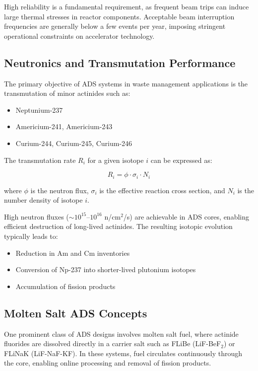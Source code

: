 High reliability is a fundamental requirement, as frequent beam trips can induce large thermal stresses in reactor components. 
Acceptable beam interruption frequencies are generally below a few events per year, imposing stringent operational constraints on 
accelerator technology.

\subsection{Neutronics and Transmutation Performance}

The primary objective of ADS systems in waste management applications is the transmutation of minor actinides such as:

\begin{itemize}
\item Neptunium-237
\item Americium-241, Americium-243
\item Curium-244, Curium-245, Curium-246
\end{itemize}

The transmutation rate $R_i$ for a given isotope $i$ can be expressed as:

\begin{equation}
R_i = \phi \cdot \sigma_i \cdot N_i
\end{equation}

where $\phi$ is the neutron flux, $\sigma_i$ is the effective reaction cross section, and $N_i$ is the number density of 
isotope $i$.

High neutron fluxes ($\sim 10^{15}$--$10^{16}$ n/cm$^2$/s) are achievable in ADS cores, enabling efficient destruction of 
long-lived actinides. The resulting isotopic evolution typically leads to:

\begin{itemize}
\item Reduction in Am and Cm inventories
\item Conversion of Np-237 into shorter-lived plutonium isotopes
\item Accumulation of fission products
\end{itemize}

\subsection{Molten Salt ADS Concepts}

One prominent class of ADS designs involves molten salt fuel, where actinide fluorides are dissolved directly in a 
carrier salt such as FLiBe (LiF-BeF$_2$) or FLiNaK (LiF-NaF-KF). In these systems, fuel circulates continuously through the core, 
enabling online processing and removal of fission products.

